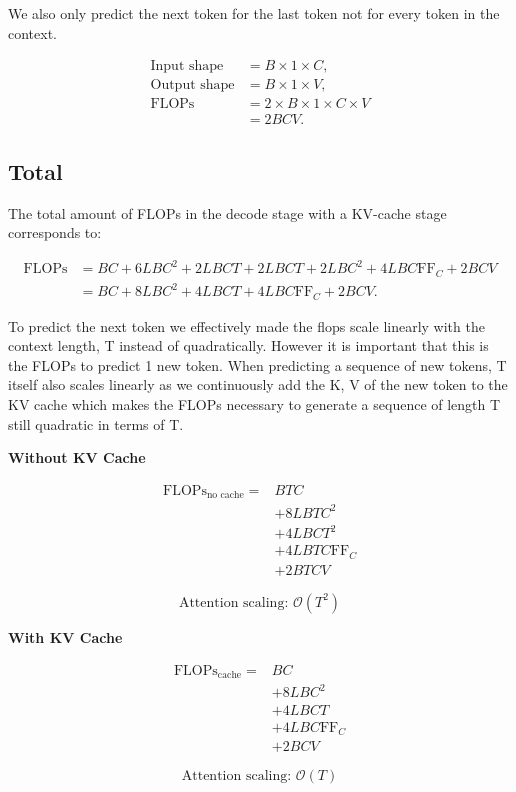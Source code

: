 \documentclass{article}
\begin{document}
We also only predict the next token for the last token not for every token in the context.

\begin{align}
\text{Input shape}  &= \boxed{B \times 1 \times C}, \\
\text{Output shape} &= \boxed{B \times 1 \times V}, \\
\text{FLOPs}
   &= 2 \times B \times 1 \times C \times V \\
   &= \boxed{2BCV}.
\end{align}

\subsection{Total}

The total amount of FLOPs in the decode stage with a KV-cache stage corresponds to:

\begin{align}
\text{FLOPs}
&= BC
+ 6LBC^2
+ 2LBCT
+ 2LBCT
+ 2LBC^2
+ 4LBC\mathrm{FF}_C
+ 2BCV \\
&= \boxed{
   BC
   + 8LBC^2
   + 4LBCT
   + 4LBC\mathrm{FF}_C
   + 2BCV
 }.
\end{align}

To predict the next token we effectively made the flops scale linearly with the context length, T instead of quadratically. However it is important that this is the FLOPs to predict 1 new token. When predicting a sequence of new tokens, T itself also scales linearly as we continuously add the K, V of the new token to the KV cache which makes the FLOPs necessary to generate a sequence of length T still quadratic in terms of T. 

\noindent
\begin{minipage}[t]{0.48\textwidth}
\centering
\textbf{Without KV Cache}

\small
\begin{align*}
\mathrm{FLOPs}_{\text{no cache}}
={}& BTC \\
 &+ 8LBTC^2 \\
 &+ 4LBCT^2 \\
 &+ 4LBTC\mathrm{FF}_C \\
 &+ 2BTCV
\end{align*}

\normalsize
\[
\text{Attention scaling: } \boxed{\mathcal{O}(T^2)}
\]
\end{minipage}
\hfill
\begin{minipage}[t]{0.48\textwidth}
\centering
\textbf{With KV Cache}

\small
\begin{align*}
\mathrm{FLOPs}_{\text{cache}}
={}& BC \\
 &+ 8LBC^2 \\
 &+ 4LBCT \\
 &+ 4LBC\mathrm{FF}_C \\
 &+ 2BCV
\end{align*}

\normalsize
\[
\text{Attention scaling: } \boxed{\mathcal{O}(T)}
\]
\end{minipage}
\end{document}
